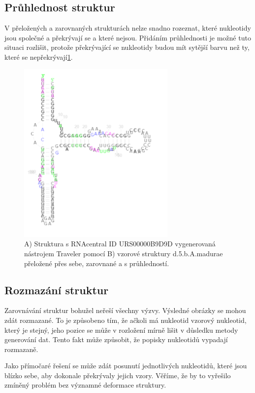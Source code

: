 \subsection{Průhlednost struktur}

V přeložených a zarovnaných strukturách nelze snadno rozeznat, které nukleotidy
jsou společné a překrývají se a které nejsou. Přidáním průhlednosti je možné
tuto situaci rozlišit, protože překrývající se nukleotidy budou mít sytější
barvu než ty, které se nepřekrývají\ref{alpha}.

\begin{figure}[H]
  \centering
  \includegraphics[height=90mm]{../img/kap02/align/aligned.png}
  \caption[Vygenerovaná a vzorová struktura vykreslené přes sebe]{A) Struktura
  s RNAcentral ID URS00000B9D9D vygenerovaná nástrojem Traveler pomocí B)
  vzorové struktury d.5.b.A.madurae přeložené přes sebe, zarovnané a s
  průhledností.}
  \label{alpha}
\end{figure}

\subsection{Rozmazání struktur}

Zarovnávání struktur bohužel neřeší všechny výzvy. Výsledné obrázky se mohou
zdát rozmazané. To je způsobeno tím, že ačkoli má nukleotid vzorový nukleotid,
který je stejný, jeho pozice se může v rozložení mírně lišit v důsledku metody
generování dat. Tento fakt může způsobit, že popisky nukleotidů vypadají
rozmazaně.

Jako přímočaré řešení se může zdát posunutí jednotlivých nukleotidů, které jsou
blízko sebe, aby dokonale překrývaly jejich vzory. Věříme, že by to vyřešilo
zmíněný problém bez významné deformace struktury.

